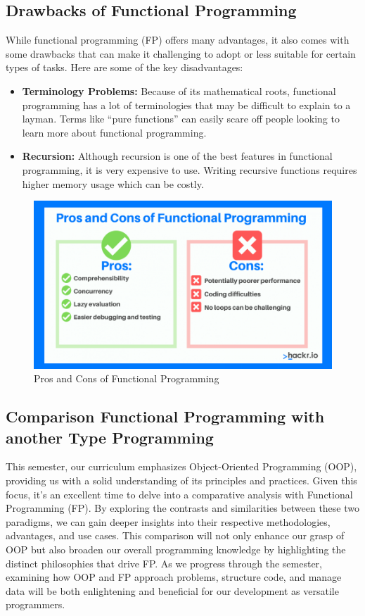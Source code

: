 \documentclass[12pt]{article}
\begin{document}
\subsection{Drawbacks of Functional Programming}
While functional programming (FP) offers many advantages, it also comes with some drawbacks that can make it challenging to adopt or less suitable for certain types of tasks. Here are some of the key disadvantages:

\begin{itemize}
    \item \textbf{Terminology Problems:} Because of its mathematical roots, functional programming has a lot of terminologies that may be difficult to explain to a layman. Terms like “pure functions” can easily scare off people looking to learn more about functional programming.
    \item \textbf{Recursion:} Although recursion is one of the best features in functional programming, it is very expensive to use. Writing recursive functions requires higher memory usage which can be costly.
\end{itemize}

\begin{figure}[h!]
\begin{center}
\includegraphics[width=13cm]{Intro2.png}\\
Pros and Cons of Functional Programming
\end{center}
\end{figure}

\subsection{Comparison Functional Programming with another Type Programming}
This semester, our curriculum emphasizes Object-Oriented Programming (OOP), providing us with a solid understanding of its principles and practices. Given this focus, it's an excellent time to delve into a comparative analysis with Functional Programming (FP). By exploring the contrasts and similarities between these two paradigms, we can gain deeper insights into their respective methodologies, advantages, and use cases. This comparison will not only enhance our grasp of OOP but also broaden our overall programming knowledge by highlighting the distinct philosophies that drive FP. As we progress through the semester, examining how OOP and FP approach problems, structure code, and manage data will be both enlightening and beneficial for our development as versatile programmers.
\end{document}
